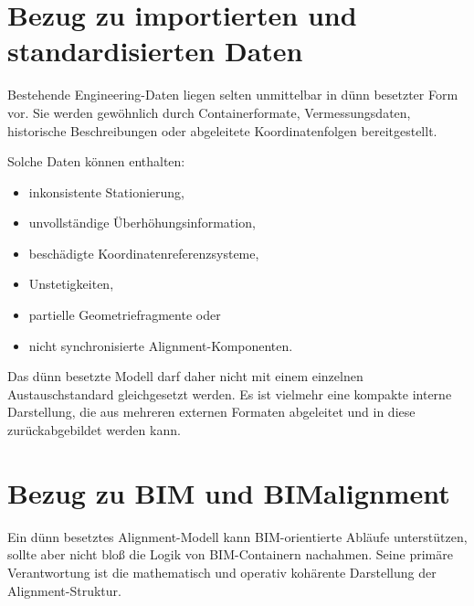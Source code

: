 \section{Bezug zu importierten und standardisierten Daten}

Bestehende Engineering-Daten liegen selten unmittelbar in dünn besetzter Form
vor. Sie werden gewöhnlich durch Containerformate, Vermessungsdaten,
historische Beschreibungen oder abgeleitete Koordinatenfolgen bereitgestellt.

Solche Daten können enthalten:
\begin{itemize}
\item inkonsistente Stationierung,
\item unvollständige Überhöhungsinformation,
\item beschädigte Koordinatenreferenzsysteme,
\item Unstetigkeiten,
\item partielle Geometriefragmente oder
\item nicht synchronisierte Alignment-Komponenten.
\end{itemize}

Das dünn besetzte Modell darf daher nicht mit einem einzelnen Austauschstandard
gleichgesetzt werden. Es ist vielmehr eine kompakte interne Darstellung, die
aus mehreren externen Formaten abgeleitet und in diese zurückabgebildet werden
kann.


\section{Bezug zu BIM und BIMalignment}

Ein dünn besetztes Alignment-Modell kann BIM-orientierte Abläufe unterstützen,
sollte aber nicht bloß die Logik von BIM-Containern nachahmen. Seine primäre
Verantwortung ist die mathematisch und operativ kohärente Darstellung der
Alignment-Struktur.


